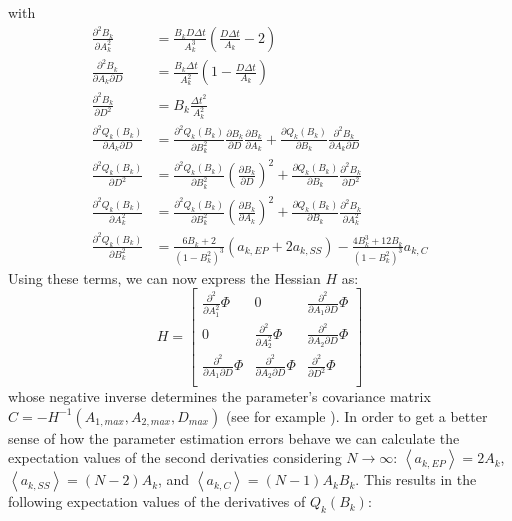 \documentclass[%
 reprint,
 amsmath,amssymb,
 aps,
]{revtex4-1}
\begin{document}
with
\begin{equation}
	\begin{aligned}
		\frac{\partial^{2} B_{k}}{\partial A_{k}^{2}} &=\frac{B_{k}D\Delta t}{A_{k}^{3}}\left(\frac{D\Delta t}{A_{k}}-2\right) \\
		\frac{\partial^{2} B_{k}}{\partial A_{k}\partial D} & = \frac{B_{k}\Delta t}{A_{k}^{2}}\left(1-\frac{D\Delta t}{A_{k}}\right)\\
		\frac{\partial^{2} B_{k}}{\partial D^{2}} &= B_{k}\frac{\Delta t^{2}}{A_{k}^{2}}\\
		\frac{\partial^{2} Q_{k}(B_{k})}{\partial A_{k}\partial D} &= 
		\frac{\partial^{2} Q_{k}(B_{k})}{\partial B_{k}^{2}}\frac{\partial B_{k}}{\partial D}\frac{\partial B_{k}}{\partial A_{k}}
		+\frac{\partial Q_{k}(B_{k})}{\partial B_{k}}\frac{\partial^{2} B_{k}}{\partial A_{k}\partial D}\\
		\frac{\partial^{2}Q_{k}(B_{k})}{\partial D^{2}} &= \frac{\partial^{2}Q_{k}(B_{k})}{\partial B_{k}^{2}}\left(\frac{\partial B_{k}}{\partial D}\right)^{2}
		+\frac{\partial Q_{k}(B_{k})}{\partial B_{k}}\frac{\partial^{2}B_{k}}{\partial D^{2}}\\
		\frac{\partial^{2}Q_{k}(B_{k})}{\partial A_{k}^{2}} &= 
		\frac{\partial^{2}Q_{k}(B_{k})}{\partial B_{k}^{2}}\left(\frac{\partial B_{k}}{\partial A_{k}}\right)^{2}
		+\frac{\partial Q_{k}(B_{k})}{\partial B_{k}}\frac{\partial^{2}B_{k}}{\partial A_{k}^{2}}\\
		\frac{\partial^{2}Q_{k}(B_{k})}{\partial B_{k}^{2}} &= \frac{6B_{k}+2}{(1-B_{k}^{2})^{3}}\left(a_{k,EP}+2a_{k,SS}\right)
		-\frac{4B_{k}^{3}+12B_{k}}{(1-B_{k}^{2})^{3}}a_{k,C}
	\end{aligned}
\end{equation}
Using these terms, we can now express the Hessian $H$ as:
\begin{equation}H=
\begin{bmatrix} 
\frac{\partial^{2}}{\partial A_{1}^2}\Phi & 0 & \frac{\partial^{2}}{\partial A_{1}\partial D}\Phi \\
0 & \frac{\partial^{2}}{\partial A_{2}^2}\Phi & \frac{\partial^{2}}{\partial A_{2}\partial D}\Phi \\
\frac{\partial^{2}}{\partial A_{1}\partial D}\Phi & \frac{\partial^{2}}{\partial A_{2}\partial D}\Phi & \frac{\partial^{2}}{\partial D^2}\Phi\\
\end{bmatrix}
\end{equation}
whose negative inverse determines the parameter's covariance matrix $C = -H^{-1}(A_{1,max},A_{2,max},D_{max})$ (see for example \cite{RN42}). In order to get a better sense of how the parameter estimation errors behave we can calculate the expectation values of the second derivaties considering $N\rightarrow \infty$: $\left\langle a_{k,EP} \right\rangle=2A_{k}$,$\left\langle a_{k,SS} \right\rangle=(N-2)A_{k}$, and $\left\langle a_{k,C} \right\rangle=(N-1)A_{k}B_{k}$.  This results in the following expectation values of the derivatives of $Q_{k}(B_{k})$:
\end{document}
